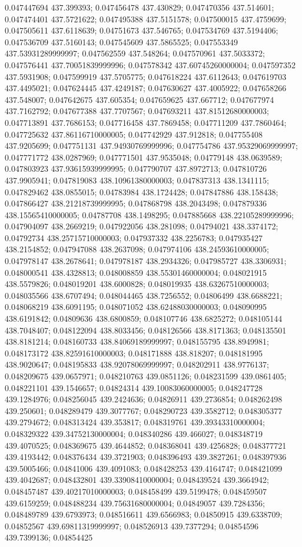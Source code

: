 0.047447694 437.399393; 0.047456478 437.430829; 0.047470356 437.514601; 0.047474401 437.5721622; 0.047495388 437.5151578; 0.047500015 437.4759699; 0.047505611 437.6118639; 0.04751673 437.546765; 0.047534769 437.5194406; 0.047536709 437.5160143; 0.047545609 437.5865525; 0.047553349 437.53931289999997; 0.047562559 437.548264; 0.047570961 437.5033372; 0.047576441 437.70051839999996; 0.047578342 437.60745260000004; 0.047597352 437.5931908; 0.047599919 437.5705775; 0.047618224 437.6112643; 0.047619703 437.4495021; 0.047624445 437.4249187; 0.047630627 437.4005922; 0.047658266 437.548007; 0.047642675 437.605354; 0.047659625 437.667712; 0.047677974 437.7162792; 0.047677388 437.7707567; 0.047693211 437.81512680000003; 0.047713891 437.7686153; 0.047716458 437.7869458; 0.047711209 437.7860464; 0.047725632 437.86116710000005; 0.047742929 437.912818; 0.047755408 437.9205699; 0.047751131 437.94930769999996; 0.047754786 437.95329069999997; 0.047771772 438.0287969; 0.047771501 437.9535048; 0.04779148 438.0639589; 0.047803923 437.93615939999995; 0.047790707 437.8972713; 0.047810726 437.9905941; 0.047819083 438.10961380000003; 0.047837313 438.1341115; 0.047829462 438.0855015; 0.04783984 438.1724428; 0.047847886 438.158438; 0.047866427 438.21218739999995; 0.047868798 438.2043498; 0.047879336 438.15565410000005; 0.04787708 438.1498295; 0.047885668 438.22105289999996; 0.047904097 438.2669219; 0.047922056 438.281098; 0.04794021 438.3374172; 0.04792734 438.25715710000003; 0.047937332 438.2256783; 0.047935427 438.2154852; 0.047947088 438.2637098; 0.047974106 438.24593610000005; 0.047978147 438.2678641; 0.047978187 438.2934326; 0.047985727 438.3306931; 0.048000541 438.4328813; 0.048008859 438.55301460000004; 0.048021915 438.5579826; 0.048019201 438.6000828; 0.048019935 438.63267510000003; 0.048035566 438.6707494; 0.048044465 438.7256552; 0.04806499 438.6688221; 0.048068219 438.6091195; 0.048071052 438.62488030000003; 0.048090995 438.6191842; 0.04809636 438.6800859; 0.048107746 438.6825272; 0.048105144 438.7048407; 0.048122094 438.8033456; 0.048126566 438.8171363; 0.048135501 438.8181214; 0.048160733 438.84069189999997; 0.048155795 438.8949981; 0.048173172 438.82591610000003; 0.048171888 438.818207; 0.048181995 438.9020647; 0.048195833 438.92078069999997; 0.048202911 438.9776137; 0.048209675 439.0657971; 0.048210763 439.0851126; 0.048231599 439.0861405; 0.048221101 439.1546657; 0.04824314 439.10083060000005; 0.048247728 439.1284976; 0.048256045 439.2424636; 0.04826911 439.2736854; 0.048262498 439.250601; 0.048289479 439.3077767; 0.048290723 439.3582712; 0.048305377 439.2794672; 0.048313424 439.353817; 0.048319761 439.39343310000004; 0.048329322 439.34752130000004; 0.048340286 439.466027; 0.048348719 439.4070525; 0.048369675 439.4644852; 0.048368041 439.4256828; 0.048377721 439.4193442; 0.048376434 439.3721903; 0.048396493 439.3827261; 0.048397936 439.5005466; 0.04841006 439.4091083; 0.048428253 439.4164747; 0.048421099 439.4042687; 0.048432801 439.33908410000004; 0.048439524 439.3664942; 0.048457487 439.40217010000003; 0.048458499 439.5199478; 0.048459507 439.6159259; 0.048488234 439.75631680000004; 0.04849057 439.7284356; 0.048489789 439.6793973; 0.048516611 439.6566983; 0.04850915 439.6338709; 0.04852567 439.69811319999997; 0.048526913 439.7377294; 0.04854596 439.7399136; 0.04854425 